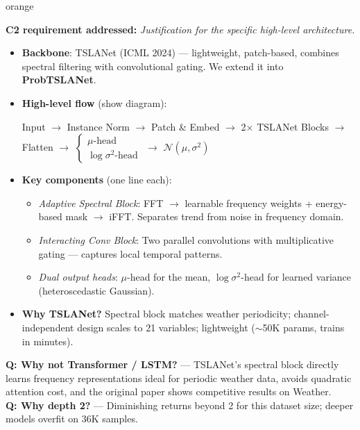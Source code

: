\documentclass[11pt,a4paper]{article}
\begin{document}
\vspace{6pt}

\begin{speakerbox}{orange}

\textbf{C2 requirement addressed:} \textit{Justification for the specific high-level architecture.}

\begin{talkingpoints}
\begin{itemize}[leftmargin=*]
    \item \textbf{Backbone}: TSLANet (ICML 2024) --- lightweight, patch-based, combines spectral filtering with convolutional gating. We extend it into \textbf{ProbTSLANet}.
    \item \textbf{High-level flow} (show diagram):
    \begin{center}
    \small Input $\to$ Instance Norm $\to$ Patch \& Embed $\to$ 2$\times$ TSLANet Blocks $\to$ Flatten $\to$ $\begin{cases} \mu\text{-head} \\ \log\sigma^2\text{-head} \end{cases}$ $\to$ $\mathcal{N}(\mu,\sigma^2)$
    \end{center}
    \item \textbf{Key components} (one line each):
    \begin{itemize}
        \item \emph{Adaptive Spectral Block}: FFT $\to$ learnable frequency weights + energy-based mask $\to$ iFFT. Separates trend from noise in frequency domain.
        \item \emph{Interacting Conv Block}: Two parallel convolutions with multiplicative gating --- captures local temporal patterns.
        \item \emph{Dual output heads}: $\mu$-head for the mean, $\log\sigma^2$-head for learned variance (heteroscedastic Gaussian).
    \end{itemize}
    \item \textbf{Why TSLANet?} Spectral block matches weather periodicity; channel-independent design scales to 21 variables; lightweight ($\sim$50K params, trains in minutes).
\end{itemize}
\end{talkingpoints}

\begin{anticipatedqa}
\textbf{Q: Why not Transformer / LSTM?} --- TSLANet's spectral block directly learns frequency representations ideal for periodic weather data, avoids quadratic attention cost, and the original paper shows competitive results on Weather. \\
\textbf{Q: Why depth 2?} --- Diminishing returns beyond 2 for this dataset size; deeper models overfit on 36K samples.
\end{anticipatedqa}

\end{speakerbox}
\end{document}
